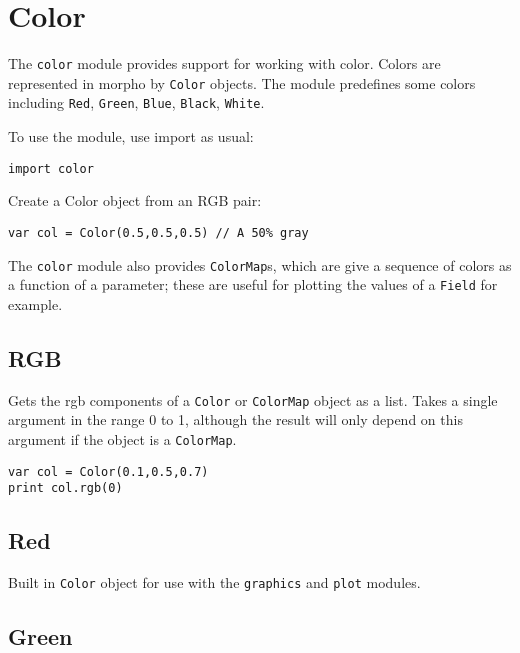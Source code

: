 \hypertarget{color}{%
\section{Color}\label{color}}

The \texttt{color} module provides support for working with color.
Colors are represented in morpho by \texttt{Color} objects. The module
predefines some colors including \texttt{Red}, \texttt{Green},
\texttt{Blue}, \texttt{Black}, \texttt{White}.

To use the module, use import as usual:

\begin{lstlisting}
import color
\end{lstlisting}

Create a Color object from an RGB pair:

\begin{lstlisting}
var col = Color(0.5,0.5,0.5) // A 50% gray
\end{lstlisting}

The \texttt{color} module also provides \texttt{ColorMap}s, which are
give a sequence of colors as a function of a parameter; these are useful
for plotting the values of a \texttt{Field} for example.

\hypertarget{rgb}{%
\subsection{RGB}\label{rgb}}

Gets the rgb components of a \texttt{Color} or \texttt{ColorMap} object
as a list. Takes a single argument in the range 0 to 1, although the
result will only depend on this argument if the object is a
\texttt{ColorMap}.

\begin{lstlisting}
var col = Color(0.1,0.5,0.7)
print col.rgb(0)
\end{lstlisting}

\hypertarget{red}{%
\subsection{Red}\label{red}}

Built in \texttt{Color} object for use with the \texttt{graphics} and
\texttt{plot} modules.

\hypertarget{green}{%
\subsection{Green}\label{green}}

